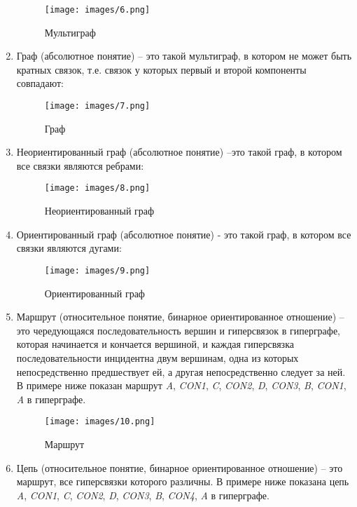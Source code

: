 \begin{enumerate}
\begin{figure}[H]
  \centering
  \texttt{[image: images/6.png]}
  \caption{Мультиграф}
\end{figure}

\item
  Граф (абсолютное понятие) -- это такой мультиграф, в котором не может
  быть кратных связок, т.е. связок у которых первый и второй компоненты
  совпадают:

\begin{figure}[H]
  \centering
  \texttt{[image: images/7.png]}
  \caption{Граф}
\end{figure}

\item
  Неориентированный граф (абсолютное понятие) --это такой граф, в
  котором все связки являются ребрами:

\begin{figure}[H]
  \centering
  \texttt{[image: images/8.png]}
  \caption{Неориентированный граф}
\end{figure}

\item
  Ориентированный граф (абсолютное понятие) - это такой граф, в котором
  все связки являются дугами:

\begin{figure}[H]
  \centering
  \texttt{[image: images/9.png]}
  \caption{Ориентированный граф}
\end{figure}

\item
  Маршрут (относительное понятие, бинарное ориентированное отношение) --
  это чередующаяся последовательность вершин и гиперсвязок в гиперграфе,
  которая начинается и кончается вершиной, и каждая гиперсвязка
  последовательности инцидентна двум вершинам, одна из которых
  непосредственно предшествует ей, а другая непосредственно следует за
  ней. В примере ниже показан маршрут \emph{A}, \emph{CON1}, \emph{C},
  \emph{CON2}, \emph{D}, \emph{CON3}, \emph{B}, \emph{CON1}, \emph{A} в
  гиперграфе.

\begin{figure}[H]
  \centering
  \texttt{[image: images/10.png]}
  \caption{Маршрут}
\end{figure}

\item
  Цепь (относительное понятие, бинарное ориентированное отношение) --
  это маршрут, все гиперсвязки которого различны. В примере ниже
  показана цепь \emph{A}, \emph{CON1}, \emph{C}, \emph{CON2}, \emph{D},
  \emph{CON3}, \emph{B}, \emph{CON4}, \emph{A} в гиперграфе.


\end{enumerate}
